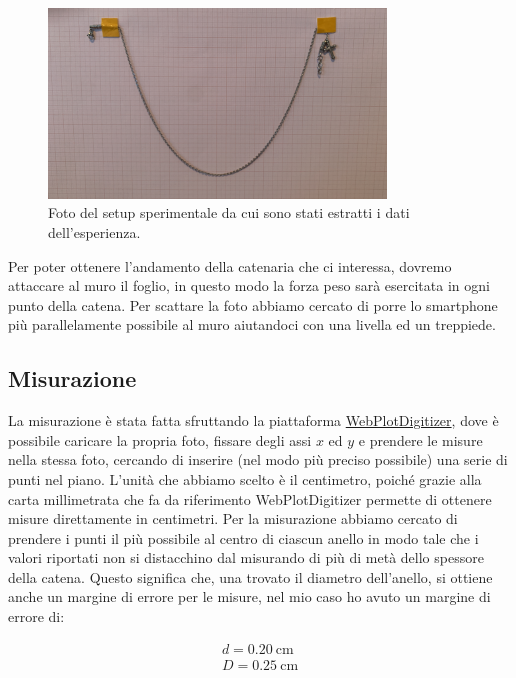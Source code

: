 \documentclass{article}
\begin{document}
\begin{figure}[ht]
    \centering
    \includegraphics[width=0.8\textwidth]{extra/catenaria_immagine.jpg}
    \caption{Foto del setup sperimentale da cui sono stati estratti i dati dell'esperienza.}
    \label{fig:my_label}
\end{figure}

Per poter ottenere l'andamento della catenaria che ci interessa,
dovremo attaccare al muro il foglio, in questo modo la forza peso sarà esercitata
in ogni punto della catena.
Per scattare la foto abbiamo cercato di porre lo smartphone più parallelamente possibile
al muro aiutandoci con una livella ed un treppiede.

\subsection{Misurazione}
La misurazione è stata fatta sfruttando la piattaforma \href{https://automeris.io/WebPlotDigitizer/}{WebPlotDigitizer},
dove è possibile caricare la propria foto,
fissare degli assi $x$ ed $y$ e prendere le misure nella stessa foto,
cercando di inserire (nel modo più preciso possibile) una serie di punti nel piano.
L'unità che abbiamo scelto è il centimetro, poiché grazie alla carta millimetrata che fa da
riferimento WebPlotDigitizer permette di ottenere misure direttamente in centimetri.
Per la misurazione abbiamo cercato di prendere i punti il più possibile al centro di ciascun anello
in modo tale che i valori riportati non si distacchino dal misurando di più di metà dello
spessore della catena.
Questo significa che, una trovato il diametro dell'anello,
si ottiene anche un margine di errore per le misure,
nel mio caso ho avuto un margine di errore di:

\begin{gather*}
    d = \SI{0.20}{\cm} \\
    D = \SI{0.25}{\cm}
\end{gather*}
\end{document}
